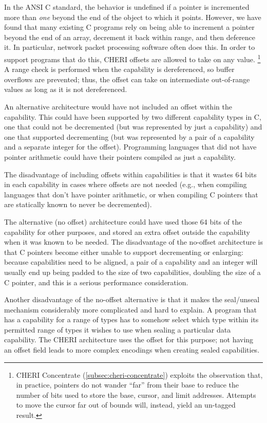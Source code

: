 In the ANSI C standard, the behavior is undefined if a pointer is incremented
more than {\it one} beyond the end of the object to which it points. However, we have found
that many existing C programs rely on being able to increment a pointer beyond
the end of an array, decrement it back within range, and then deference it.
In particular, network packet processing software often does this.
In order to support programs that do this, CHERI offsets are allowed to take
on any value.%
%
\footnote{CHERI Concentrate (\cref{subsec:cheri-concentrate}) exploits the
observation that, in practice, pointers do not wander ``far'' from their base
to reduce the number of bits used to store the base, cursor, and limit
addresses.  Attempts to move the cursor far out of bounds will, instead, yield
an un-tagged result.}
%
A range check is performed when the capability is
dereferenced, so buffer overflows are prevented; thus, the offset can take
on intermediate out-of-range values as long as it is not dereferenced.

An alternative architecture would have not included an offset within the
capability. This could have been supported by two different capability types
in C, one that could not be decremented (but was represented by just a
capability) and one that supported decrementing (but was represented by a pair of
a capability and a separate integer for the offset).  Programming languages
that did not have pointer arithmetic could have their pointers compiled as
just a capability.

The disadvantage of including offsets within capabilities is that it wastes
64 bits in each capability in cases where offsets are not needed (e.g.,
when compiling languages that don't have pointer arithmetic, or when
compiling C pointers that are statically known to never be decremented).

The alternative (no offset) architecture could have used those 64 bits
of the capability for other purposes, and stored an extra offset outside
the capability when it was known to be needed.  The disadvantage of the
no-offset architecture is that C pointers become either unable to support
decrementing or enlarging: because capabilities need to be aligned, a pair of a
capability and an integer will usually end up
being padded to the size of two capabilities, doubling the size of a C pointer,
and this is a serious performance consideration.

Another disadvantage of the no-offset alternative is that it makes the
seal/unseal mechanism considerably more complicated and hard to explain.
A program that has a capability for a range of types has to somehow select
which type within its permitted range of types it wishes to use when sealing a
particular data capability. The CHERI architecture uses the offset for this
purpose; not having an offset field leads to more complex encodings when
creating sealed capabilities.


